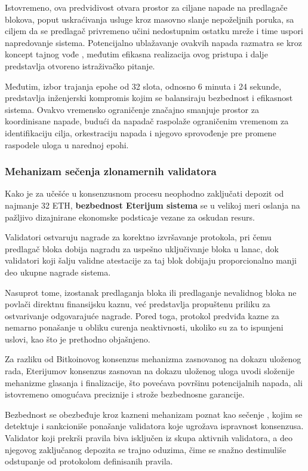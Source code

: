 Istovremeno, ova predvidivost otvara prostor za ciljane napade na predlagače blokova, poput uskraćivanja usluge kroz masovno slanje nepoželjnih poruka, sa ciljem da se predlagač privremeno učini nedostupnim ostatku mreže i time uspori napredovanje sistema. Potencijalno ublažavanje ovakvih napada razmatra se kroz koncept tajnog vođe \cite{burianova2025secret}, međutim efikasna realizacija ovog pristupa i dalje predstavlja otvoreno istraživačko pitanje.

Međutim, izbor trajanja epohe od 32 slota, odnosno 6 minuta i 24 sekunde, predstavlja inženjerski kompromis kojim se balansiraju bezbednost i efikasnost sistema. Ovakvo vremensko ograničenje značajno smanjuje prostor za koordinisane napade, budući da napadač raspolaže ograničenim vremenom za identifikaciju cilja, orkestraciju napada i njegovo sprovođenje pre promene raspodele uloga u narednoj epohi.

\subsubsection{Mehanizam sečenja zlonamernih validatora}
Kako je za učešće u konsenzusnom procesu neophodno zaključati depozit od najmanje 32 ETH, \textbf{bezbednost Eterijum sistema} se u velikoj meri oslanja na pažljivo dizajnirane ekonomske podsticaje vezane za oskudan resurs. 

Validatori ostvaruju nagrade za korektno izvršavanje protokola, pri čemu predlagač bloka dobija nagradu za uspešno uključivanje bloka u lanac, dok validatori koji šalju validne atestacije za taj blok dobijaju proporcionalno manji deo ukupne nagrade sistema.

Nasuprot tome, izostanak predlaganja bloka ili predlaganje nevalidnog bloka ne povlači direktnu finansijsku kaznu, već predstavlja propuštenu priliku za ostvarivanje odgovarajuće nagrade. Pored toga, protokol predviđa kazne za nemarno ponašanje u obliku curenja neaktivnosti, ukoliko su za to ispunjeni uslovi, kao što je prethodno objašnjeno.

Za razliku od Bitkoinovog konsenzus mehanizma zasnovanog na dokazu uloženog rada, Eterijumov konsenzus zasnovan na dokazu uloženog uloga uvodi složenije mehanizme glasanja i finalizacije, što povećava površinu potencijalnih napada, ali istovremeno omogućava preciznije i strože bezbednosne garancije.

Bezbednost se obezbeđuje kroz kazneni mehanizam poznat kao sečenje , kojim se detektuje i sankcioniše ponašanje validatora koje ugrožava ispravnost konsenzusa. Validator koji prekrši pravila biva isključen iz skupa aktivnih validatora, a deo njegovog zaključanog depozita se trajno oduzima, čime se snažno destimuliše odstupanje od protokolom definisanih pravila.

